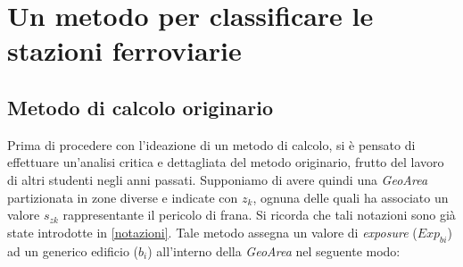 
\section{Un metodo per classificare le stazioni ferroviarie}


\subsection{Metodo di calcolo originario}
\label{metodoVecchio}
Prima di procedere con l'ideazione di un metodo di calcolo, si è pensato di effettuare un'analisi critica e dettagliata del metodo originario, frutto del lavoro di altri studenti negli anni passati.
Supponiamo di avere quindi una \textit{GeoArea} partizionata in zone diverse e indicate con $z_k$, ognuna delle quali ha associato un valore $s_{zk}$ rappresentante il pericolo di frana. Si ricorda che tali notazioni sono già state introdotte in \ref{notazioni}.
Tale metodo assegna un valore di \textit{exposure} ($Exp_{bi}$) ad un generico edificio ($b_i$) all'interno della \textit{GeoArea} nel seguente modo:
